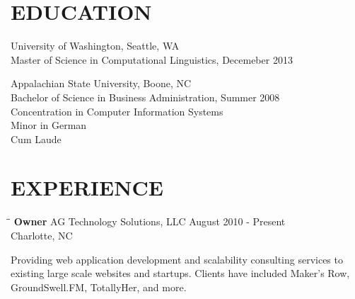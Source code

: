 \documentclass{res}
\begin{document}
 


\address{\large\bf  Anthony Gentile}
\address{6932 Loretta Place \\  Charlotte, NC 28215 \\  (704) 657-8550 \\ asgentile@gmail.com}
                                  
\begin{resume}      
 
\section{EDUCATION}   
    University of Washington, Seattle, WA  \\        
    Master of Science in Computational Linguistics, Decemeber 2013
           
    Appalachian State University, Boone, NC  \\        
    Bachelor of Science in Business Administration, Summer 2008   \\       
    Concentration in Computer Information Systems       \\   
    Minor in German  \\        
    Cum Laude

\section{EXPERIENCE}
   \vspace{-0.1in}	
   \begin{tabbing}
   \hspace{2.3in}\= \hspace{2.6in}\= \kill %
    {\bf Owner} \>AG Technology Solutions, LLC     \> August 2010 - Present\\
                             \>Charlotte, NC
   \end{tabbing}\vspace{-5pt}      %
    Providing web application development and scalability consulting services to existing large scale websites and startups. Clients have included Maker's Row, GroundSwell.FM, TotallyHer, and more.
    

\end{resume}
\end{document}

